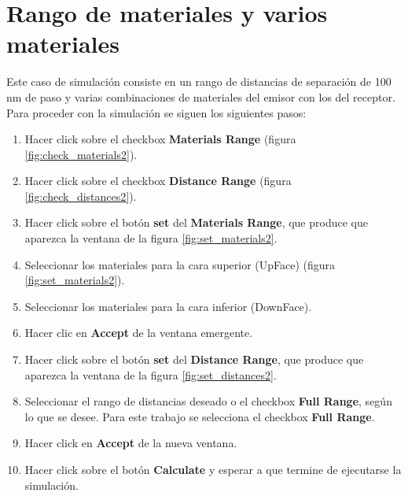 \section{Rango de materiales y varios materiales}\label{DrMr}
Este caso de simulación consiste en un rango de distancias de separación de 100 nm de paso y varias combinaciones de materiales del emisor con los del receptor. Para proceder con la simulación se siguen los siguientes pasos:
\begin{enumerate}
			\item Hacer click sobre el checkbox \textbf{Materials Range} (figura \ref{fig:check_materials2}).
			\item Hacer click sobre el checkbox \textbf{Distance Range} (figura \ref{fig:check_distances2}).
			\item Hacer click sobre el botón \textbf{set} del \textbf{Materials Range}, que produce que aparezca la ventana de la figura \ref{fig:set_materials2}.
			\item Seleccionar los materiales para la cara superior (UpFace) (figura \ref{fig:set_materials2}).
			\item Seleccionar los materiales para la cara inferior (DownFace).
			\item Hacer clic en \textbf{Accept} de la ventana emergente.
			\item Hacer click sobre el botón \textbf{set} del \textbf{Distance Range}, que produce que aparezca la ventana de la figura \ref{fig:set_distances2}.
			\item Seleccionar el rango de distancias deseado o el checkbox \textbf{Full Range}, según lo que se desee. Para este trabajo se selecciona el checkbox \textbf{Full Range}.
			\item Hacer click en \textbf{Accept} de la nueva ventana.
			\item Hacer click sobre el botón \textbf{Calculate} y esperar a que termine de ejecutarse la simulación.
\end{enumerate}
